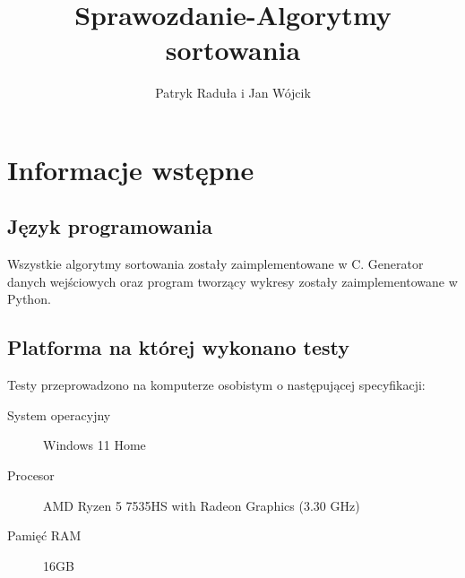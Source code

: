 \documentclass[11pt]{article}
\title{Sprawozdanie-Algorytmy sortowania}
\author{Patryk Raduła i Jan Wójcik}
\begin{document}
	\maketitle
	\section{Informacje wstępne}
	\subsection{Język programowania}
	Wszystkie algorytmy sortowania zostały zaimplementowane w C. Generator danych wejściowych oraz program tworzący wykresy zostały zaimplementowane w Python.
	\subsection{Platforma na której wykonano testy}
	Testy przeprowadzono na komputerze osobistym o następującej specyfikacji:
	\begin{description}
		\item[System operacyjny] Windows 11 Home
		\item[Procesor] AMD Ryzen 5 7535HS with Radeon Graphics (3.30 GHz)
		\item[Pamięć RAM] 16GB
	\end{description}
	
	\pagestyle{empty}
	
\end{document}
